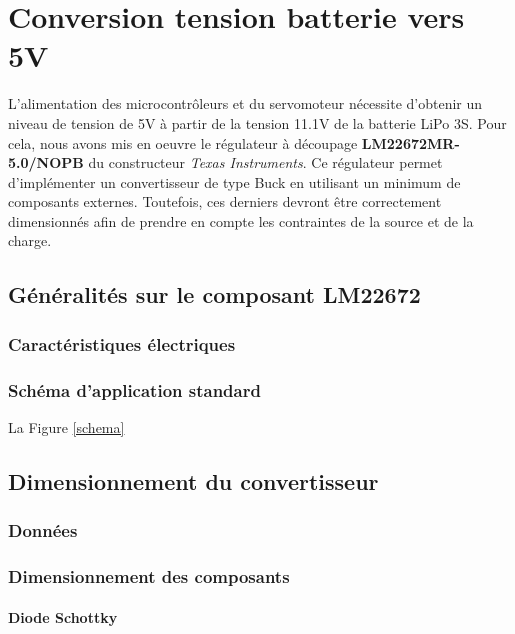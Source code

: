 \documentclass[a4paper,12pt]{report}
\begin{document}
			\section{Conversion tension batterie vers 5V}
			
			L'alimentation des microcontrôleurs et du servomoteur nécessite d'obtenir un niveau de tension de 5V à partir de la tension 11.1V de la batterie LiPo 3S. Pour cela, nous avons mis en oeuvre le régulateur à découpage \textbf{LM22672MR-5.0/NOPB} du constructeur \textit{Texas Instruments}. Ce régulateur permet d'implémenter un convertisseur de type Buck en utilisant un minimum de composants externes. Toutefois, ces derniers devront être correctement dimensionnés afin de prendre en compte les contraintes de la source et de la charge.
			
			\subsection{Généralités sur le composant LM22672}
			
				\subsubsection{Caractéristiques électriques}
			
				\subsubsection{Schéma d'application standard}
				
				La Figure \ref{schema}
			
			\subsection{Dimensionnement du convertisseur}
			
				\subsubsection{Données }
				
				\subsubsection{Dimensionnement des composants}
				
					\paragraph{Diode Schottky}
					
\end{document}
